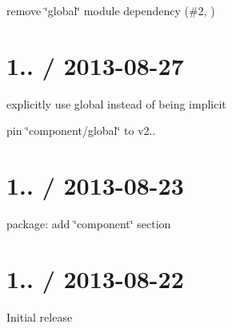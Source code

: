 
\begin{DoxyItemize}
\item remove \char`\"{}global\char`\"{} module dependency (\#2, )
\end{DoxyItemize}

\section*{1.. / 2013-\/08-\/27 }


\begin{DoxyItemize}
\item explicitly use {\ttfamily global} instead of being implicit
\item pin \char`\"{}component/global\char`\"{} to v2..
\end{DoxyItemize}

\section*{1.. / 2013-\/08-\/23 }


\begin{DoxyItemize}
\item package\+: add \char`\"{}component\char`\"{} section
\end{DoxyItemize}

\section*{1.. / 2013-\/08-\/22 }


\begin{DoxyItemize}
\item Initial release 
\end{DoxyItemize}